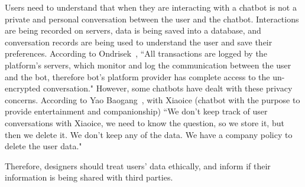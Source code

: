 \documentclass[a4paper,10pt]{article}
\begin{document}
Users need to understand that when they are interacting with a chatbot is not a private and personal conversation between the user and the chatbot. Interactions are being recorded on servers, data is being saved into a database, and conversation records are being used to understand the user and save their preferences. According to Ondrisek~\cite{PrivacyandDataSecurityofChatbots}, ``All transactions are logged by the platform’s servers, which monitor and log the communication between the user and the bot, therefore bot's platform provider has complete access to the un-encrypted conversation."  However, some chatbots have dealt with these privacy concerns. According to Yao Baogang~\cite{ForSympatheticEar}, with Xiaoice (chatbot with the purpose to provide entertainment and companionship) ``We don’t keep track of user conversations with Xiaoice, we need to know the question, so we store it, but then we delete it. We don’t keep any of the data. We have a company policy to delete the user data."

Therefore, designers should treat users' data ethically, and inform if their information is being shared with third parties.   


\section*{}



\section*{}

	
\medskip


\end{document}
